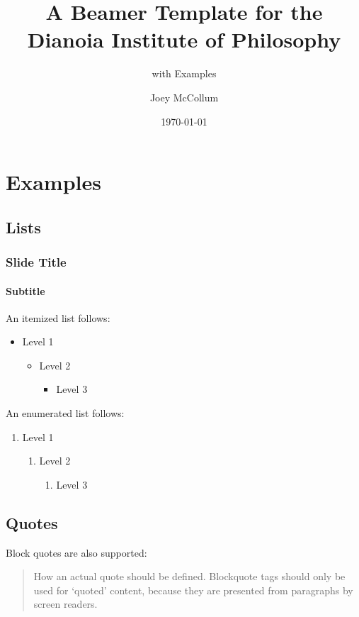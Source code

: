 \documentclass[11pt]{beamer}
\title{A Beamer Template for the Dianoia Institute of Philosophy}%
\subtitle{with Examples} %
\date{\today}%
\author{Joey McCollum}%
\institute{Institute for Religion and Critical Inquiry\\Australian Catholic University}%
\begin{document}
	\begin{frame}
		\titlepage
	\end{frame}
	\section{Examples}
	\sectionframe
	\subsection{Lists}
	\begin{frame}
		\frametitle{Slide Title}
		\framesubtitle{Subtitle}
		An itemized list follows:
		\begin{itemize}
			\item Level 1
			\begin{itemize}
				\item Level 2
				\begin{itemize}
					\item Level 3
				\end{itemize}
			\end{itemize}
		\end{itemize}
		\vspace{\baselineskip}

		An enumerated list follows:
		\begin{enumerate}
			\item Level 1
			\begin{enumerate}
				\item Level 2
				\begin{enumerate}
					\item Level 3
				\end{enumerate}
			\end{enumerate}
		\end{enumerate}
	\end{frame}
	\subsection{Quotes}
	\begin{frame}
		Block quotes are also supported:
		\begin{quote}
			How an actual quote should be defined. Blockquote tags should only be used for `quoted' content, because they are presented from paragraphs by screen readers.
		\end{quote}
	\end{frame}
\end{document}
